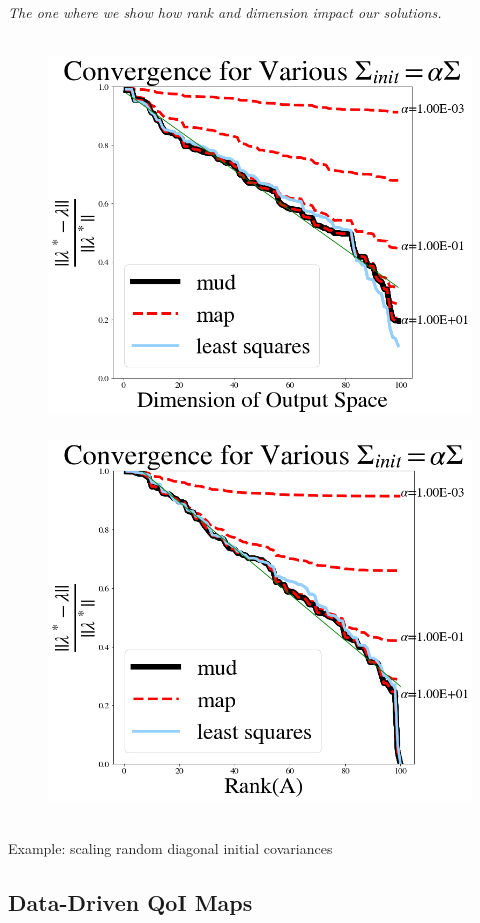 \begin{frame}{\it The one where we show how rank and dimension impact our solutions.}
\centering

\begin{figure}[htbp]
\hbox{
  \includegraphics[width=0.5\linewidth]{figures/lin/lin-dim-cov-convergence}
  \includegraphics[width=0.5\linewidth]{figures/lin/lin-rank-cov-convergence}
}
\label{fig:lin-error}
\end{figure}

Example: scaling random diagonal initial covariances

\end{frame}


\subsection{Data-Driven QoI Maps}

